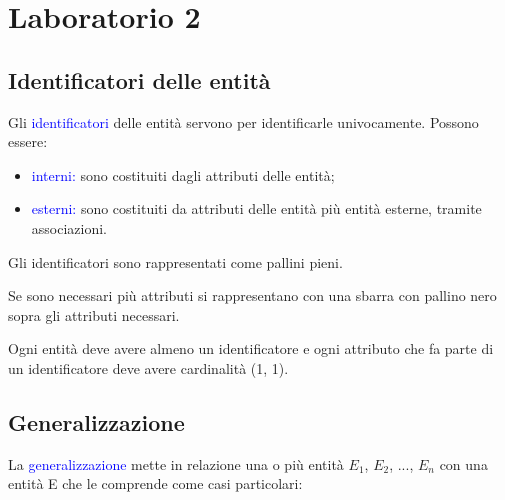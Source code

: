 \chapter{Laboratorio 2}

\section{Identificatori delle entità}

Gli \textcolor{blue}{identificatori} delle entità servono per identificarle univocamente. Possono essere:
\begin{itemize}
    \item \textcolor{blue}{interni:} sono costituiti dagli attributi delle entità;
    \item \textcolor{blue}{esterni:} sono costituiti da attributi delle entità più entità esterne, tramite associazioni.
\end{itemize}

Gli identificatori sono rappresentati come pallini pieni.

\begin{center}
\end{center}

Se sono necessari più attributi si rappresentano con una sbarra con pallino nero sopra gli attributi necessari.

Ogni entità deve avere almeno un identificatore e ogni attributo che fa parte di un identificatore deve avere  cardinalità (1, 1).

\section{Generalizzazione}

La \textcolor{blue}{generalizzazione} mette in relazione una o più entità $E_1$, $E_2$, ..., $E_n$ con una entità E che le comprende come casi particolari:

